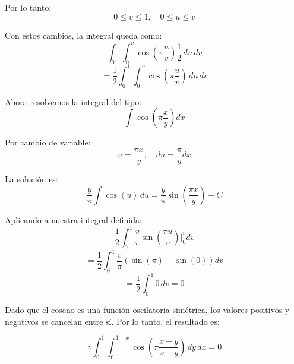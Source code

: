 Por lo tanto:
\[
0 \leq v \leq 1, \quad 0 \leq u \leq v
\]

Con estos cambios, la integral queda como:
\[
\int_0^1 \int_0^{v} \cos\left(\pi \frac{u}{v}\right) \frac{1}{2} \, du \, dv
\]
\[
= \frac{1}{2} \int_0^1 \int_0^{v} \cos\left(\pi \frac{u}{v}\right) \, du \, dv
\]

Ahora resolvemos la integral del tipo:
\[
\int \cos\left(\pi \frac{x}{y}\right) dx
\]

Por cambio de variable:
\[
u = \frac{\pi x}{y}, \quad du = \frac{\pi}{y} dx
\]

La solución es:
\[
\frac{y}{\pi} \int \cos(u) \, du = \frac{y}{\pi} \sin\left(\frac{\pi x}{y}\right) + C
\]

Aplicando a nuestra integral definida:
\[
\frac{1}{2} \int_0^1 \frac{v}{\pi} \sin\left(\frac{\pi u}{v}\right) \bigg|_0^v dv
\]
\[
= \frac{1}{2} \int_0^1 \frac{v}{\pi} \left(\sin(\pi) - \sin(0)\right) dv
\]
\[
= \frac{1}{2} \int_0^1 0 \, dv = 0
\]

Dado que el coseno es una función oscilatoria simétrica, los valores positivos y negativos se cancelan entre sí. Por lo tanto, el resultado es:

\[
\therefore \int_0^1 \int_0^{1-x} \cos\left(\pi \frac{x-y}{x+y}\right) \, dy \, dx = 0
\]
